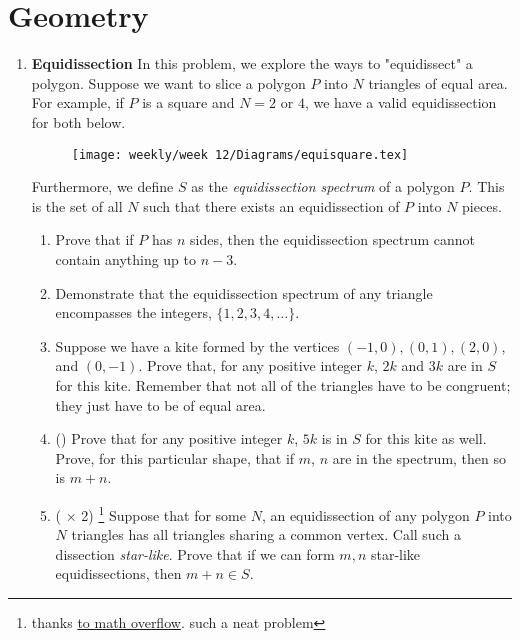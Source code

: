 \documentclass[11pt]{scrartcl}
\begin{document}
\newpage
\section{Geometry}
\begin{enumerate}[label=\textbf{G\arabic*}.]
    \item \textbf{Equidissection} \newline
    In this problem, we explore the ways to "equidissect" a polygon. Suppose we want to slice a polygon $P$ into $N$ triangles of equal area. For example, if $P$ is a square and $N = 2$ or $4$, we have a valid equidissection for both below. \newline
    
    \begin{figure}[h]
        \centering
        \texttt{[image: weekly/week 12/Diagrams/equisquare.tex]}
        \hspace{2em}
        \label{fig:equisquare}
    \end{figure}
    
    Furthermore, we define $S$ as the \textit{equidissection spectrum} of a polygon $P$. This is the set of all $N$ such that there exists an equidissection of $P$ into $N$ pieces.
    
    \begin{enumerate}
        \item Prove that if $P$ has $n$ sides, then the equidissection spectrum cannot contain anything up to $n - 3$.
    
        \item Demonstrate that the equidissection spectrum of any triangle encompasses the integers, $\{1, 2, 3, 4, \dots \}$.
        
        \item Suppose we have a kite formed by the vertices $(-1, 0), (0, 1), (2, 0)$, and $(0, -1)$. Prove that, for any positive integer $k$, $2k$ and $3k$ are in $S$ for this kite. Remember that not all of the triangles have to be congruent; they just have to be of equal area.
        
        \item (\fullchili) Prove that for any positive integer $k$, $5k$ is in $S$ for this kite as well. Prove, for this particular shape, that if $m$, $n$ are in the spectrum, then so is $m + n$.
        
        \item (\fullchili \hspace{1pt} $\times$ 2) \footnote{thanks \href{https://mathoverflow.net/questions/133777/is-the-equidissection-spectrum-closed-under-addition}{to math overflow}. such a neat problem} Suppose that for some $N$, an equidissection of any polygon $P$ into $N$ triangles has all triangles sharing a common vertex. Call such a dissection \textit{star-like}. Prove that if we can form $m, n$ star-like equidissections, then $m+n \in S$.
        

\end{enumerate}
\end{enumerate}
\end{document}

